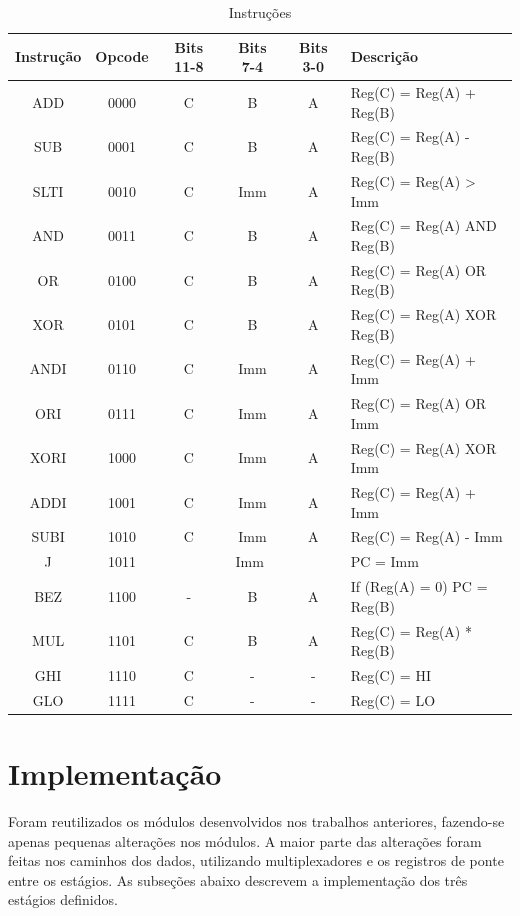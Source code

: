 \documentclass[11pt,a4paper,titlepage]{article}
\begin{document}
\begin{table}[!h]
\centering
\begin{tabular}{| c | c | c | c | c | l |}
\hline
Instrução & Opcode & Bits 11-8 & Bits 7-4 & Bits 3-0 & Descrição \\
\hline
 ADD  & 0000 & C & B & A   & Reg(C) = Reg(A) + Reg(B) \\
\hline
 SUB  & 0001 & C & B & A   & Reg(C) = Reg(A) - Reg(B) \\
\hline
 SLTI & 0010 & C & Imm & A & Reg(C) = Reg(A) > Imm \\
\hline
 AND  & 0011 & C & B & A   & Reg(C) = Reg(A) AND Reg(B) \\
\hline
 OR   & 0100 & C & B & A   & Reg(C) = Reg(A) OR Reg(B) \\
\hline
 XOR  & 0101 & C & B & A   & Reg(C) = Reg(A) XOR Reg(B) \\
\hline
 ANDI & 0110 & C & Imm & A & Reg(C) = Reg(A) + Imm \\
\hline
 ORI  & 0111 & C & Imm & A & Reg(C) = Reg(A) OR Imm \\
\hline
 XORI & 1000 & C & Imm & A & Reg(C) = Reg(A) XOR Imm \\
\hline
 ADDI & 1001 & C & Imm & A & Reg(C) = Reg(A) + Imm \\
\hline
 SUBI & 1010 & C & Imm & A & Reg(C) = Reg(A) - Imm \\
\hline
 J    & 1011 & \multicolumn{3}{c|}{Imm} & PC = Imm \\
\hline
 BEZ  & 1100 & - & B & A   & If (Reg(A) = 0) PC = Reg(B) \\
\hline
 MUL  & 1101 & C & B & A   & Reg(C) = Reg(A) * Reg(B) \\
\hline
 GHI  & 1110 & C & - & -   & Reg(C) = HI \\
\hline
 GLO  & 1111 & C & - & -   & Reg(C) = LO \\
\hline
\end{tabular}
\caption{Instruções}
\label{tab:instructions}
\end{table}
%

\section{Implementação}

Foram reutilizados os módulos desenvolvidos nos trabalhos anteriores, fazendo-se apenas pequenas alterações nos módulos. A maior parte das alterações foram feitas nos caminhos dos dados, utilizando multiplexadores e os registros de ponte entre os estágios. As subseções abaixo descrevem a implementação dos três estágios definidos.
\end{document}
